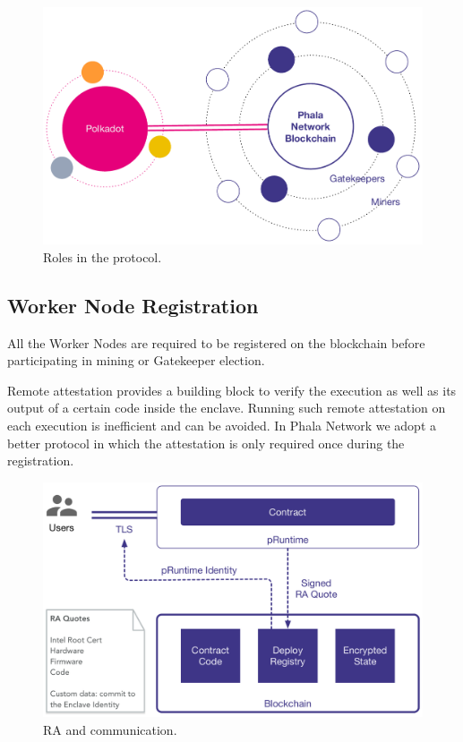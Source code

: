 \begin{figure}
    \centering \footnotesize
    \includegraphics[width=\columnwidth]{img/pLIBRA-roles}
    \caption{Roles in the protocol.}
    \label{fig:roles}
\end{figure}

\subsection{Worker Node Registration}

All the Worker Nodes are required to be registered on the blockchain before participating in mining or Gatekeeper election.

Remote attestation provides a building block to verify the execution as well as its output of a certain code inside the enclave. Running such remote attestation on each execution is inefficient and can be avoided. In Phala Network we adopt a better protocol in which the attestation is only required once during the registration.

\begin{figure}
    \centering \footnotesize
    \includegraphics[width=.7\columnwidth]{img/pLIBRA-communication}
    \caption{RA and communication. }
    \label{fig:communication}
\end{figure}

